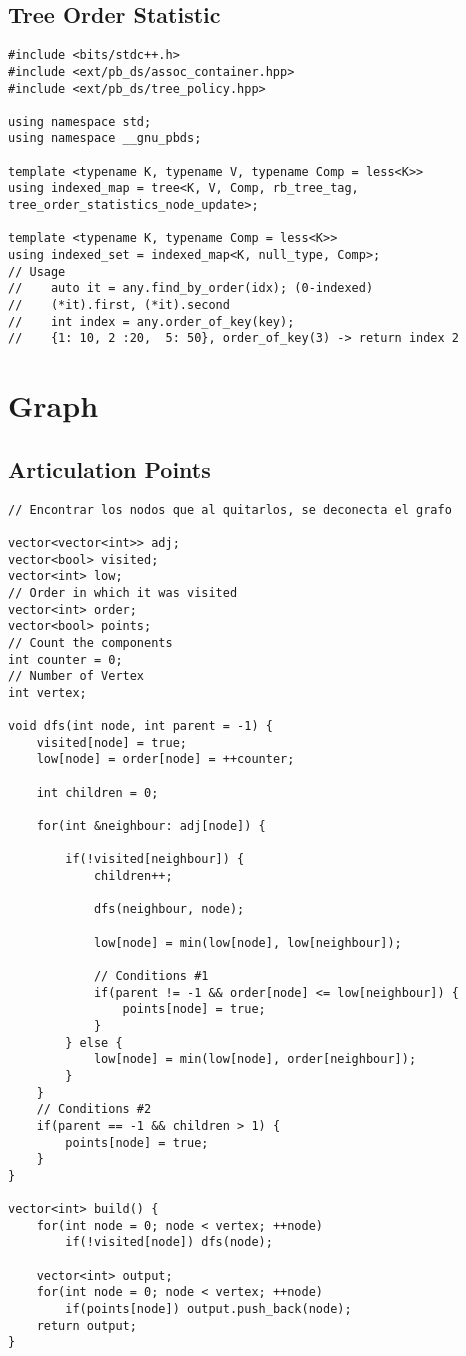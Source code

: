 \documentclass[10pt,letterpaper,twocolumn,twosided]{article}
\begin{document}
\subsection{Tree Order Statistic}
\begin{lstlisting}
#include <bits/stdc++.h>
#include <ext/pb_ds/assoc_container.hpp> 
#include <ext/pb_ds/tree_policy.hpp>

using namespace std;
using namespace __gnu_pbds;

template <typename K, typename V, typename Comp = less<K>>
using indexed_map = tree<K, V, Comp, rb_tree_tag, tree_order_statistics_node_update>;

template <typename K, typename Comp = less<K>>
using indexed_set = indexed_map<K, null_type, Comp>;
// Usage
//    auto it = any.find_by_order(idx); (0-indexed)
//    (*it).first, (*it).second
//    int index = any.order_of_key(key);
//    {1: 10, 2 :20,  5: 50}, order_of_key(3) -> return index 2
\end{lstlisting}

\section{Graph}

\subsection{Articulation Points}
\begin{lstlisting}
// Encontrar los nodos que al quitarlos, se deconecta el grafo

vector<vector<int>> adj;
vector<bool> visited;
vector<int> low;
// Order in which it was visited
vector<int> order;
vector<bool> points;
// Count the components
int counter = 0;
// Number of Vertex
int vertex;

void dfs(int node, int parent = -1) {
    visited[node] = true;
    low[node] = order[node] = ++counter;

    int children = 0;

    for(int &neighbour: adj[node]) {

        if(!visited[neighbour]) {
            children++;

            dfs(neighbour, node);

            low[node] = min(low[node], low[neighbour]);
            
            // Conditions #1
            if(parent != -1 && order[node] <= low[neighbour]) {
                points[node] = true;
            }
        } else {
            low[node] = min(low[node], order[neighbour]);
        }
    }
    // Conditions #2
    if(parent == -1 && children > 1) {
        points[node] = true;
    }
}

vector<int> build() {
    for(int node = 0; node < vertex; ++node)
        if(!visited[node]) dfs(node);
    
    vector<int> output;
    for(int node = 0; node < vertex; ++node)
        if(points[node]) output.push_back(node);
    return output;
}
\end{lstlisting}
\end{document}
